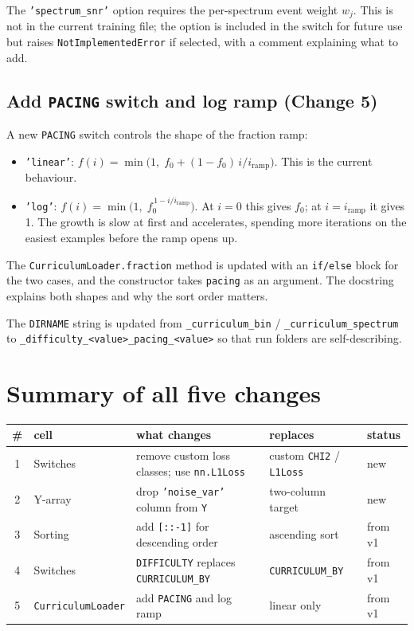 \documentclass[11pt]{article}
\newcommand{\code}[1]{\texttt{#1}}
\begin{document}
The \code{'spectrum\_snr'} option requires the per-spectrum event weight $w_j$.
This is not in the current training file; the option is included in the switch
for future use but raises \code{NotImplementedError} if selected, with a
comment explaining what to add.

\subsection{Add \texttt{PACING} switch and log ramp (Change 5)}

A new \code{PACING} switch controls the shape of the fraction ramp:

\begin{itemize}
  \item \code{'linear'}: $f(i) = \min\bigl(1,\; f_0 + (1-f_0)\,i/i_\text{ramp}\bigr)$.
    This is the current behaviour.
  \item \code{'log'}: $f(i) = \min\bigl(1,\; f_0^{\,1 - i/i_\text{ramp}}\bigr)$.
    At $i=0$ this gives $f_0$; at $i = i_\text{ramp}$ it gives 1. The growth
    is slow at first and accelerates, spending more iterations on the easiest
    examples before the ramp opens up.
\end{itemize}

The \code{CurriculumLoader.fraction} method is updated with an \code{if/else}
block for the two cases, and the constructor takes \code{pacing} as an
argument. The docstring explains both shapes and why the sort order matters.

The \code{DIRNAME} string is updated from \code{\_curriculum\_bin} /
\code{\_curriculum\_spectrum} to \code{\_difficulty\_<value>\_pacing\_<value>}
so that run folders are self-describing.

\section{Summary of all five changes}

\begin{center}
\small
\begin{tabular}{cllll}
\toprule
\# & cell & what changes & replaces & status \\
\midrule
1 & Switches & remove custom loss classes; use \code{nn.L1Loss} &
  custom \code{CHI2} / \code{L1Loss} & new \\
2 & Y-array & drop \code{'noise\_var'} column from \code{Y} &
  two-column target & new \\
3 & Sorting & add \code{[::-1]} for descending order &
  ascending sort & from v1 \\
4 & Switches & \code{DIFFICULTY} replaces \code{CURRICULUM\_BY} &
  \code{CURRICULUM\_BY} & from v1 \\
5 & \code{CurriculumLoader} & add \code{PACING} and log ramp &
  linear only & from v1 \\
\bottomrule
\end{tabular}
\end{center}
\end{document}
